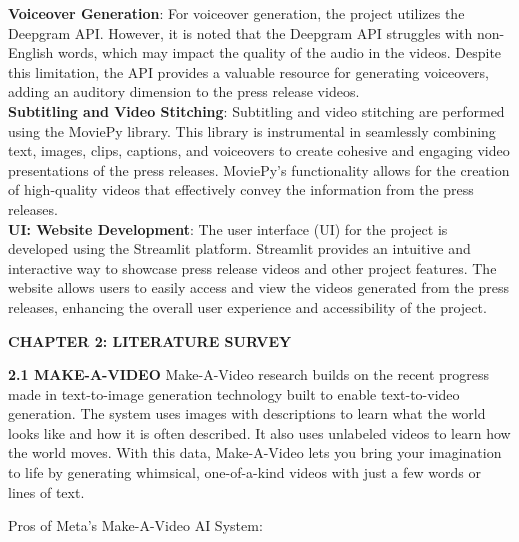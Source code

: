 \documentclass[12pt]{article}
\begin{document}
\textbf{Voiceover Generation}: For voiceover generation, the project utilizes the Deepgram API. However, it is noted that the Deepgram API struggles with non-English words, which may impact the quality of the audio in the videos. Despite this limitation, the API provides a valuable resource for generating voiceovers, adding an auditory dimension to the press release videos.\\

\textbf{Subtitling and Video Stitching}: Subtitling and video stitching are performed using the MoviePy library. This library is instrumental in seamlessly combining text, images, clips, captions, and voiceovers to create cohesive and engaging video presentations of the press releases. MoviePy's functionality allows for the creation of high-quality videos that effectively convey the information from the press releases.\\

\textbf{UI: Website Development}: The user interface (UI) for the project is developed using the Streamlit platform. Streamlit provides an intuitive and interactive way to showcase press release videos and other project features. The website allows users to easily access and view the videos generated from the press releases, enhancing the overall user experience and accessibility of the project.


\noindent  
\pagebreak

\begin{center} \fontsize{14}{14} \textbf{CHAPTER 2: LITERATURE SURVEY } \end{center}

\noindent \fontsize{12}{12}\textbf{2.1 MAKE-A-VIDEO}
\justify
\hspace{5mm}Make-A-Video research builds on the recent progress made in text-to-image generation technology built to enable text-to-video generation. The system uses images with descriptions to learn what the world looks like and how it is often described. It also uses unlabeled videos to learn how the world moves. With this data, Make-A-Video lets you bring your imagination to life by generating whimsical, one-of-a-kind videos with just a few words or lines of text.

\justify
Pros of Meta's Make-A-Video AI System:
\end{document}

